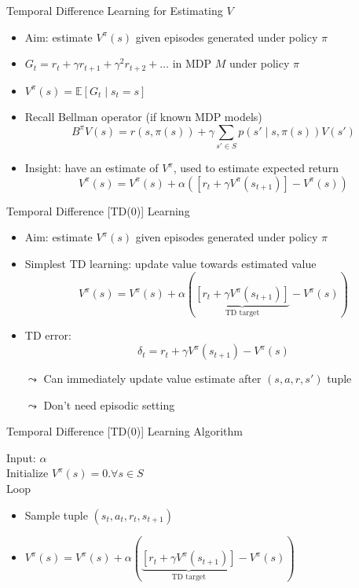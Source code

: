 \begin{frame}[c]{Temporal Difference Learning for Estimating $V$}

\begin{itemize}
	\item Aim: estimate $V^\pi(s)$ given episodes generated under policy $\pi$
	\item $G_t = r_t + \gamma r_{t+1} + \gamma^2 r_{t+2} + \ldots$  in MDP $M$ under policy $\pi$
	\item $V^\pi(s) = \mathbb{E}[G_t \mid s_t = s]$
	\smallskip
	\pause
	\item Recall Bellman operator (if known MDP models)
	$$B^\pi V(s) = r(s,\pi(s)) + \gamma \sum_{s'\in S} p(s'\mid s, \pi(s)) V(s')$$
	\pause
	\item Insight: have an estimate of $V^\pi$, used to estimate expected return
	$$ V^\pi(s) = V^\pi(s) + \alpha ([r_t + \gamma V^\pi (s_{t+1})] - V^\pi(s))$$
\end{itemize}


\end{frame}
\begin{frame}[c]{Temporal Difference [TD(0)] Learning}
	
	\begin{itemize}
		\item Aim: estimate $V^\pi(s)$ given episodes generated under policy $\pi$
		\item Simplest TD learning: update value towards estimated value
		$$ V^\pi(s) = V^\pi(s) + \alpha (\underbrace{[r_t + \gamma V^\pi (s_{t+1})]}_{\text{TD target}} - V^\pi(s))$$
		\pause
		\item TD error:
		$$ \delta_t = r_t + \gamma V^\pi(s_{t+1}) - V^\pi (s) $$
		\pause
		\item[$\leadsto$] Can immediately update value estimate after $(s,a,r,s')$ tuple
		\item[$\leadsto$] Don’t need episodic setting
	\end{itemize}
	
\end{frame}
\begin{frame}[c]{Temporal Difference [TD(0)] Learning Algorithm}
	
	Input: $\alpha$\\
	Initialize $V^\pi(s) = 0. \forall s \in S$\\
	Loop\\
	\begin{itemize}
		\item Sample tuple $(s_t, a_t, r_t, s_{t+1})$
		\item $V^\pi(s) = V^\pi(s) + \alpha (\underbrace{[r_t + \gamma V^\pi (s_{t+1})]}_{\text{TD target}} - V^\pi(s))$
	\end{itemize}
	
\end{frame}
